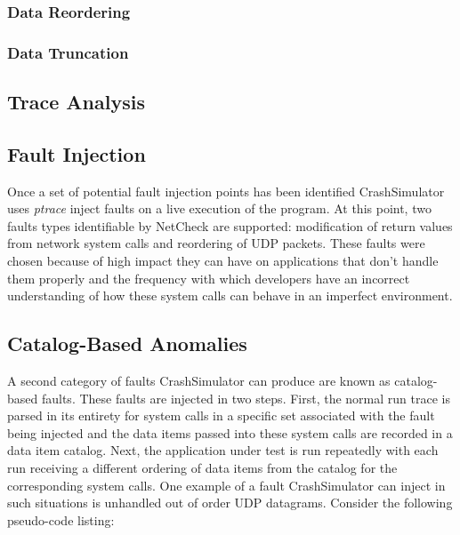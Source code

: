         \subsubsection{Data Reordering}

        \subsubsection{Data Truncation}

    \subsection{Trace Analysis}



    \subsection{Fault Injection}

        Once a set of potential fault injection points has been identified CrashSimulator uses \emph{ptrace} inject
        faults on a live execution of the program. At this point, two faults types identifiable by NetCheck are
        supported: modification of return values from network system calls and reordering of UDP packets.  These faults
        were chosen because of high impact they can have on applications that don't handle them properly and the
        frequency with which developers have an incorrect understanding of how these system calls can behave in an
        imperfect environment.

        \subsection{Catalog-Based Anomalies}

        A second category of faults CrashSimulator can produce are known as catalog-based faults. These faults are
        injected in two steps. First, the normal run trace is parsed in its entirety for system calls in a specific set
        associated with the fault being injected and the data items passed into these system calls are recorded in a
        data item catalog. Next, the application under test is run repeatedly with each run receiving a different
        ordering of data items from the catalog for the corresponding system calls. One example of a fault
        CrashSimulator can inject in such situations is unhandled out of order UDP datagrams. Consider the following
        pseudo-code listing:

